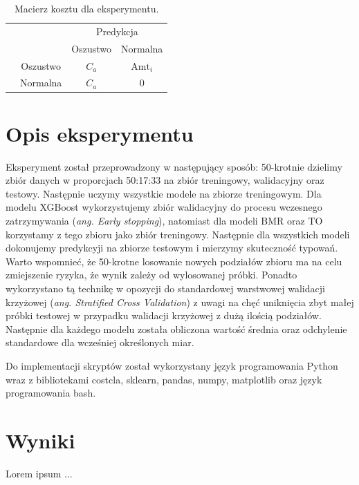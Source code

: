\documentclass[openany]{book}
\begin{document}
	\begin{table}[h]
		\begin{center}
			\makegapedcells
			\begin{tabular}{cc|cc}
				\multicolumn{2}{c}{}     &   \multicolumn{2}{c}{Predykcja} \\
				&            &   Oszustwo &   Normalna     \\ 
				\cline{2-4}
				\multirow{2}{*}{\rotatebox[origin=c]{90}{Prawda}} & Oszustwo   & $C_a$         & $\text{Amt}_i$              \\
				& Normalna   & $C_a$         & $0$              \\ 
				\cline{2-4}
			\end{tabular}
		\end{center}
		\caption{Macierz kosztu dla eksperymentu.}
		\label{macierz-kosztu-eksperyment}
	\end{table}
	
\section{Opis eksperymentu}
	Eksperyment został przeprowadzony w następujący sposób:
	50-krotnie dzielimy zbiór danych w proporcjach 50:17:33 na zbiór treningowy, walidacyjny oraz testowy. Następnie uczymy wszystkie modele na zbiorze treningowym. Dla modelu XGBoost wykorzystujemy zbiór walidacyjny do procesu wczesnego zatrzymywania (\textit{ang. Early stopping}), natomiast dla modeli BMR oraz TO korzystamy z tego zbioru jako zbiór treningowy. Następnie dla wszystkich modeli dokonujemy predykcyji na zbiorze testowym i mierzymy skuteczność typowań. Warto wspomnieć, że 50-krotne losowanie nowych podziałów zbioru ma na celu zmiejszenie ryzyka, że wynik zależy od wylosowanej próbki. Ponadto wykorzystano tą technikę w opozycji do standardowej warstwowej walidacji krzyżowej (\textit{ang. Stratified Cross Validation}) z uwagi na chęć uniknięcia zbyt małej próbki testowej w przypadku walidacji krzyżowej z dużą ilością podziałów. Następnie dla każdego modelu została obliczona wartość średnia oraz odchylenie standardowe dla wcześniej określonych miar.
	
	Do implementacji skryptów został wykorzystany język programowania Python wraz z bibliotekami costcla, sklearn, pandas, numpy, matplotlib oraz język programowania bash.

\section{Wyniki}
	Lorem ipsum ...
	
\end{document}
